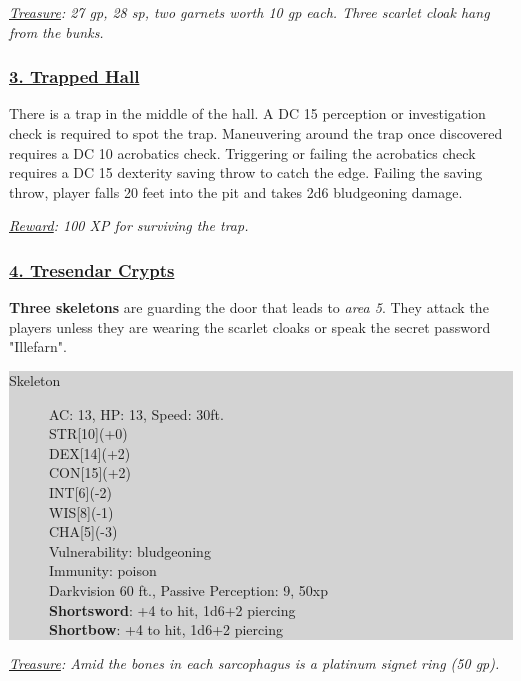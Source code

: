\emph{\underline{Treasure}: 27 gp, 28 sp, two garnets worth 10 gp each. Three scarlet cloak hang from the bunks.}

\subsubsection*{\underline{3. Trapped Hall}}
There is a trap in the middle of the hall. A DC 15 perception or investigation check is required to spot the trap. Maneuvering around the trap once discovered requires a DC 10 acrobatics check. Triggering or failing the acrobatics check requires a DC 15 dexterity saving throw to catch the edge. Failing the saving throw, player falls 20 feet into the pit and takes 2d6 bludgeoning damage.

\emph{\underline{Reward}: 100 XP for surviving the trap.}

\subsubsection*{\underline{4. Tresendar Crypts}}
\textbf{Three skeletons} are guarding the door that leads to \emph{area 5}. They attack the players unless they are wearing the scarlet cloaks or speak the secret password "Illefarn".

\colorbox{lightgray}{\begin{minipage}{0.4\textwidth}
		\begin{description}
			\item[Skeleton]
			AC: 13, HP: 13, Speed: 30ft.
			\\ STR[10](+0) 
			\\ DEX[14](+2)
			\\ CON[15](+2)
			\\ INT[6](-2)
			\\ WIS[8](-1)
			\\ CHA[5](-3) 
			\\ Vulnerability: bludgeoning
			\\ Immunity: poison
			\\ Darkvision 60 ft., Passive Perception: 9, 50xp
			\\ \textbf{Shortsword}: +4 to hit, 1d6+2 piercing
			\\ \textbf{Shortbow}: +4 to hit, 1d6+2 piercing
		\end{description}
\end{minipage}}
\break

\emph{\underline{Treasure}: Amid the bones in each sarcophagus is a platinum signet ring (50 gp).}

